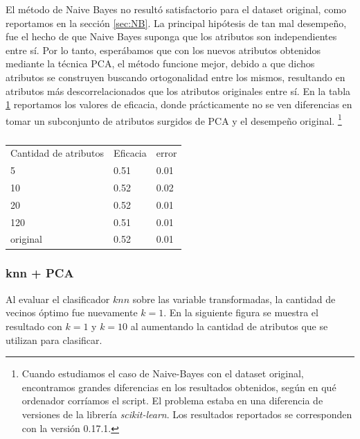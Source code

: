 \documentclass[a4paper,10pt]{article}
\begin{document}
\par El método de Naive Bayes no resultó satisfactorio para el dataset original, como reportamos en la sección \ref{sec:NB}. La principal hipótesis de tan mal desempeño, fue el hecho de que Naive Bayes suponga que los atributos son independientes entre sí. Por lo tanto, esper\'abamos que con los nuevos atributos obtenidos mediante la técnica PCA, el método funcione mejor, debido a que dichos atributos se construyen buscando ortogonalidad entre los mismos, resultando en atributos más descorrelacionados que los atributos originales entre sí. En la tabla \ref{table:NB} reportamos los valores de eficacia, donde prácticamente no se ven diferencias en tomar un subconjunto de atributos surgidos de PCA y el desempeño original. \footnote{Cuando estudiamos el caso de Naive-Bayes con el dataset original, encontramos grandes diferencias en los resultados obtenidos, según en qué ordenador corríamos el script. El problema estaba en una diferencia de versiones de la librería \emph{scikit-learn}. Los resultados reportados se corresponden con la versión 0.17.1.}

\begin{table}[H]
\centering
\caption{}
\label{table:NB}
\begin{tabular}{lll}
Cantidad de atributos & Eficacia & error \\
5 & 0.51 & 0.01 \\
10 & 0.52 & 0.02 \\
20 & 0.52 & 0.01 \\
120 & 0.51 & 0.01 \\
original & 0.52 & 0.01 \\
\end{tabular}
\end{table}

\subsubsection{knn + PCA}

Al evaluar el clasificador $knn$ sobre las variable transformadas, la cantidad de vecinos \'optimo fue nuevamente $k=1$. En la siguiente figura se muestra el resultado con $k=1$ y $k=10$ al aumentando la cantidad de atributos que se utilizan para clasificar.  
\end{document}
